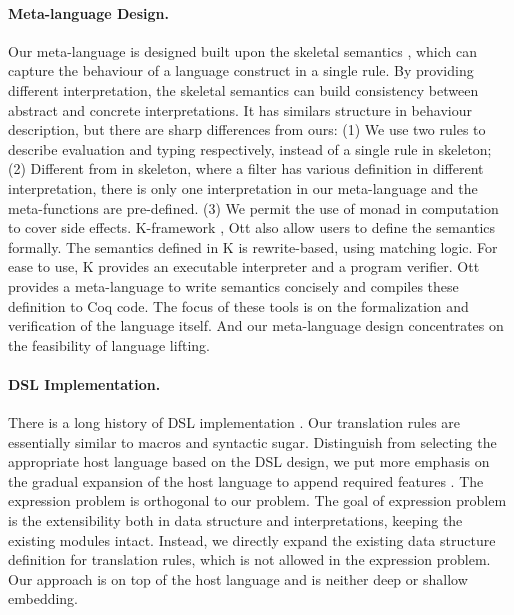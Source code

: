 \paragraph{Meta-language Design.}
Our meta-language is designed built upon the skeletal semantics \cite{skeleton},
 which can capture the behaviour of a language construct in a single rule.
By providing different interpretation,
 the skeletal semantics can build consistency between abstract and concrete interpretations.
It has similars structure in behaviour description,
 but there are sharp differences from ours:
(1) We use two rules to describe evaluation and typing respectively, instead of a single rule in skeleton;
(2) Different from in skeleton, where a filter has various definition in different interpretation, 
 there is only one interpretation in our meta-language and the meta-functions are pre-defined.
(3) We permit the use of monad in computation to cover side effects.
K-framework \cite{K-framework}, Ott \cite{Ott} also allow users to define the semantics formally.
The semantics defined in K is rewrite-based, using matching logic.
For ease to use, K provides an executable interpreter and a program verifier.
Ott provides a meta-language to write semantics concisely and compiles these definition to Coq code.
The focus of these tools is on the formalization and verification of the language itself.
And our meta-language design concentrates on the feasibility of language lifting.

\paragraph{DSL Implementation.}
There is a long history of DSL implementation \cite{MartinDSL,when-how-dsl}.
Our translation rules are essentially similar to macros and syntactic sugar.
Distinguish from selecting the appropriate host language based on the DSL design,
 we put more emphasis on the gradual expansion of the host language to append required features \cite{MoggiMeta}.
The expression problem \cite{expr-problem} is orthogonal to our problem.
The goal of expression problem is the extensibility both in data structure and interpretations,
 keeping the existing modules intact.
Instead, we directly expand the existing data structure definition for translation rules,
 which is not allowed in the expression problem.
Our approach is on top of the host language and is neither deep or shallow embedding.
